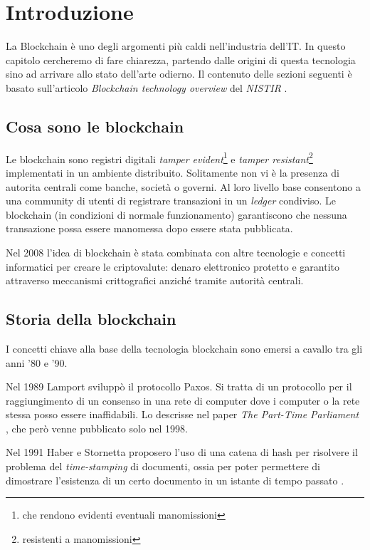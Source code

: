 \chapter{Introduzione}

La Blockchain è uno degli argomenti più caldi nell'industria dell'IT. In questo
capitolo cercheremo di fare chiarezza, partendo dalle origini di questa tecnologia
sino ad arrivare allo stato dell'arte odierno.
Il contenuto delle sezioni seguenti è basato sull'articolo
\textit{Blockchain technology overview} del \textit{NISTIR} \cite{yaga2018blockchain}.

\section{Cosa sono le blockchain}
Le blockchain sono registri digitali
\textit{tamper evident}\footnote{che rendono evidenti eventuali manomissioni}
e \textit{tamper resistant}\footnote{resistenti a manomissioni}
implementati in un ambiente distribuito.
Solitamente non vi è la presenza di autorita centrali come banche, società o governi.
Al loro livello base consentono a una community di utenti di registrare
transazioni in un \textit{ledger} condiviso.
Le blockchain (in condizioni di normale funzionamento) garantiscono che
nessuna transazione possa essere manomessa dopo essere stata pubblicata.

Nel 2008 l'idea di blockchain
è stata combinata con altre tecnologie e concetti informatici
per creare le criptovalute:
denaro elettronico protetto e garantito attraverso meccanismi crittografici anziché
tramite autorità centrali.

\section{Storia della blockchain}
I concetti chiave alla base della tecnologia blockchain sono emersi a cavallo tra gli anni '80 e '90.

Nel 1989 Lamport sviluppò il protocollo Paxos. Si tratta di
un protocollo per il raggiungimento di un consenso in una rete di computer
dove i computer o la rete stessa posso essere inaffidabili. Lo descrisse nel paper
\textit{The Part-Time Parliament} \cite{lamport1998part},
che però venne pubblicato solo nel 1998.

Nel 1991 Haber e Stornetta proposero l'uso di una catena di hash
per risolvere il problema del \textit{time-stamping} di documenti,
ossia per poter permettere di dimostrare l'esistenza di un certo
documento in un istante di tempo passato \cite{haber1990time}.

